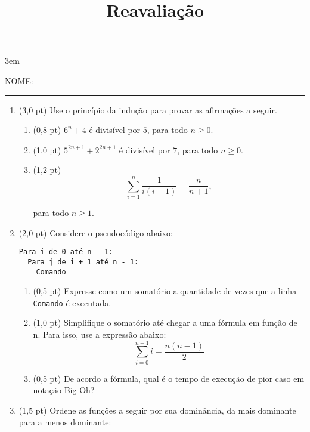 \documentclass[a4paper,10pt]{article}
\title{Reavaliação}
\begin{document}
\maketitle

\emergencystretch 3em



NOME: \rule{.85\textwidth}{0.1mm}

\begin{multicols*}{2}
\setlength{\leftmargini}{0pt}
\begin{enumerate}
  \item (3,0 pt) Use o princípio da indução para provar as afirmações a seguir.

  \begin{enumerate}
    \item (0,8 pt) $ 6^{n} + 4 $ é divisível por $ 5 $, para todo $ n \geq 0 $.
    \item (1,0 pt) $ 5^{2n+1} + 2^{2n+1} $ é divisível por $ 7 $, para todo $ n \geq 0 $.
    \item (1,2 pt)
    \[
      \sum_{i=1}^{n} \frac{1}{i(i + 1)} = \frac{n}{n + 1},
    \]

    para todo $ n \geq 1 $.
  \end{enumerate}

  \item (2,0 pt) Considere o pseudocódigo abaixo:

  \begin{verbatim}
Para i de 0 até n - 1:
  Para j de i + 1 até n - 1:
    Comando
  \end{verbatim}

    \begin{enumerate}
      \item (0,5 pt) Expresse como um somatório a quantidade de vezes que a linha \texttt{Comando} é executada.
      \item (1,0 pt) Simplifique o somatório até chegar a uma fórmula em função de n. Para isso, use a expressão abaixo:
      \[
        \sum_{i = 0}^{n - 1} i = \frac{n(n - 1)}{2}
      \]

      \item (0,5 pt) De acordo a fórmula, qual é o tempo de execução de pior caso em notação Big-Oh?
    \end{enumerate}

  \item (1,5 pt) Ordene as funções a seguir por sua dominância, da mais dominante para a menos dominante:


\end{enumerate}
\end{multicols*}
\end{document}
